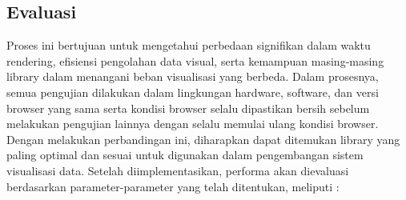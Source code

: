 \subsection{Evaluasi}
Proses ini bertujuan untuk mengetahui perbedaan signifikan dalam waktu rendering, efisiensi pengolahan data visual, serta kemampuan masing-masing library dalam menangani beban visualisasi yang berbeda. Dalam prosesnya, semua pengujian dilakukan dalam lingkungan hardware, software, dan versi browser yang sama serta kondisi browser selalu dipastikan bersih sebelum melakukan pengujian lainnya dengan selalu memulai ulang kondisi browser. Dengan melakukan perbandingan ini, diharapkan dapat ditemukan library yang paling optimal dan sesuai untuk digunakan dalam pengembangan sistem visualisasi data. Setelah diimplementasikan, performa akan dievaluasi berdasarkan parameter-parameter yang telah ditentukan, meliputi : 
